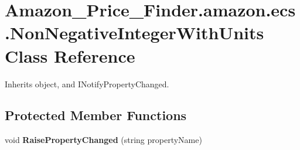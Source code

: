 \hypertarget{class_amazon___price___finder_1_1amazon_1_1ecs_1_1_non_negative_integer_with_units}{\section{Amazon\-\_\-\-Price\-\_\-\-Finder.\-amazon.\-ecs.\-Non\-Negative\-Integer\-With\-Units Class Reference}
\label{class_amazon___price___finder_1_1amazon_1_1ecs_1_1_non_negative_integer_with_units}
}


 




Inherits object, and I\-Notify\-Property\-Changed.

\subsection*{Protected Member Functions}
\begin{DoxyCompactItemize}
\item 
\hypertarget{class_amazon___price___finder_1_1amazon_1_1ecs_1_1_non_negative_integer_with_units_aa345e3e9efbca93d0a4ac30d88901db7}{void {\bfseries Raise\-Property\-Changed} (string property\-Name)}\label{class_amazon___price___finder_1_1amazon_1_1ecs_1_1_non_negative_integer_with_units_aa345e3e9efbca93d0a4ac30d88901db7}

\end{DoxyCompactItemize}
